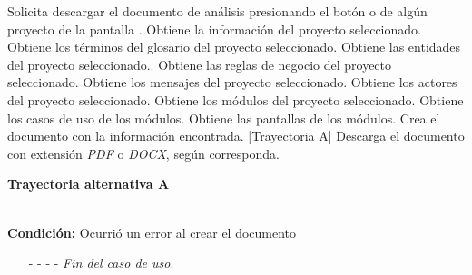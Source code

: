 \begin{UCtrayectoria}
	\UCpaso[\UCactor] Solicita descargar el documento de análisis presionando el botón  o  de algún proyecto de la pantalla .
	\UCpaso[\UCsist] Obtiene la información del proyecto seleccionado.
	\UCpaso[\UCsist] Obtiene los términos del glosario del proyecto seleccionado.
	\UCpaso[\UCsist] Obtiene las entidades del proyecto seleccionado..
	\UCpaso[\UCsist] Obtiene las reglas de negocio del proyecto seleccionado.
	\UCpaso[\UCsist] Obtiene los mensajes del proyecto seleccionado.
	\UCpaso[\UCsist] Obtiene los actores del proyecto seleccionado.
	\UCpaso[\UCsist] Obtiene los módulos del proyecto seleccionado.
	\UCpaso[\UCsist] Obtiene los casos de uso de los módulos.
	\UCpaso[\UCsist] Obtiene las pantallas de los módulos.
	\UCpaso[\UCsist] Crea el documento con la información encontrada. \hyperlink{CU13:TAA}{[Trayectoria A]}
	\UCpaso[\UCsist] Descarga el documento con extensión {\em PDF} o {\em DOCX}, según corresponda.
\end{UCtrayectoria}		
\hypertarget{CU13:TAA}{\textbf{Trayectoria alternativa A}}\\
\noindent \textbf{Condición:} Ocurrió un error al crear el documento
\begin{enumerate}
	\UCpaso[\UCsist] Muestra el mensaje  en la pantalla .
	\item[- -] - - {\em {Fin del caso de uso}}.%
\end{enumerate}
